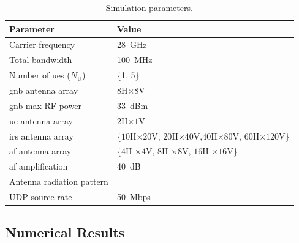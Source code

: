\def\arraystretch{1.3}
\begin{table}[t!]
  \caption{Simulation parameters.}
  \label{Tab:parameters}
  \centering
  \scriptsize
  \begin{tabular}{l|l}
    \toprule
    Parameter                  & Value \\ \midrule
    Carrier frequency		   & 28~GHz	\\
    Total bandwidth			   & 100~MHz \\
    Number of \glspl{ue} ($N_{\mathrm U}$)  & \{1, 5\} \\
    \gls{gnb} antenna array    & $8$H$\times8$V \\
    \gls{gnb} max RF power	   & 33~dBm \\
    \gls{ue} antenna array     & $2$H$\times1$V \\
    \gls{irs} antenna array    & \{$10$H$\times20$V, $20$H$\times40$V,$ 40$H$\times80$V, $60$H$\times120$V\} \\
    \gls{af} antenna array     & \{$4$H $\times4$V, $8$H $\times8$V, $16$H $\times16$V\} \\
    \gls{af} amplification & 40~dB \\
    Antenna radiation pattern  & \cite[Table 7.3-1]{3gpp.38.901} \\
    UDP source rate			   & 50~Mbps\\
    \bottomrule
  \end{tabular}
\end{table}




\subsection{Numerical Results} %
\label{sub:numerical_results}

